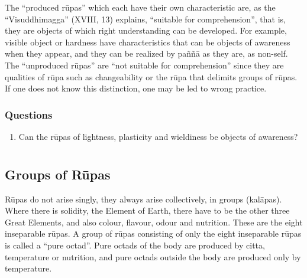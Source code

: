\documentclass{book}
\begin{document}
The ``produced r\=upas'' which each have their own characteristic are,
as the ``Visuddhimagga'' (XVIII, 13) explains, ``suitable for
comprehension'', that is, they are objects of which right understanding
can be developed. For example, visible object or hardness have
characteristics that can be objects of awareness when they appear, and
they can be realized by pa\~n\~n{\=a} as they are, as non-self. The
``unproduced r\=upas'' are ``not suitable for comprehension'' since
they are qualities of r\=upa such as changeability or the r\=upa that
delimits groups of r\=upas. If one does not know this distinction, one
may be led to wrong practice. 






\subsection*{Questions}

\begin{enumerate}
\item Can the r\=upas of lightness, plasticity and wieldiness be objects
of awareness? 

\end{enumerate}

















\chapter[Groups of R\=upas]{} 
\section*{Groups of R\=upas}



R\=upas do not arise singly, they always arise collectively, in groups
(kal{\=a}pas). Where there is solidity, the Element of Earth, there
have to be the other three Great Elements, and also colour, flavour,
odour and nutrition. These are the eight inseparable r\=upas. A group
of r\=upas consisting of only the eight inseparable r\=upas is called a
``pure octad''. Pure octads of the body are produced by citta,
temperature or nutrition, and pure octads outside the body are produced
only by temperature.
\end{document}
